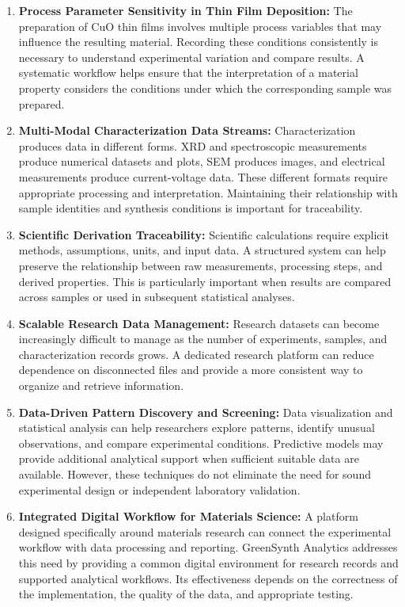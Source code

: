 \documentclass[12pt,a4paper,oneside]{report}
\begin{document}
{{{\begin{enumerate}
    \item \textbf{Process Parameter Sensitivity in Thin Film Deposition:} The preparation of $\text{CuO}$ thin films involves multiple process variables that may influence the resulting material. Recording these conditions consistently is necessary to understand experimental variation and compare results. A systematic workflow helps ensure that the interpretation of a material property considers the conditions under which the corresponding sample was prepared.
    \item \textbf{Multi-Modal Characterization Data Streams:} Characterization produces data in different forms. XRD and spectroscopic measurements produce numerical datasets and plots, SEM produces images, and electrical measurements produce current-voltage data. These different formats require appropriate processing and interpretation. Maintaining their relationship with sample identities and synthesis conditions is important for traceability.
    \item \textbf{Scientific Derivation Traceability:} Scientific calculations require explicit methods, assumptions, units, and input data. A structured system can help preserve the relationship between raw measurements, processing steps, and derived properties. This is particularly important when results are compared across samples or used in subsequent statistical analyses.
    \item \textbf{Scalable Research Data Management:} Research datasets can become increasingly difficult to manage as the number of experiments, samples, and characterization records grows. A dedicated research platform can reduce dependence on disconnected files and provide a more consistent way to organize and retrieve information.
    \item \textbf{Data-Driven Pattern Discovery and Screening:} Data visualization and statistical analysis can help researchers explore patterns, identify unusual observations, and compare experimental conditions. Predictive models may provide additional analytical support when sufficient suitable data are available. However, these techniques do not eliminate the need for sound experimental design or independent laboratory validation.
    \item \textbf{Integrated Digital Workflow for Materials Science:} A platform designed specifically around materials research can connect the experimental workflow with data processing and reporting. GreenSynth Analytics addresses this need by providing a common digital environment for research records and supported analytical workflows. Its effectiveness depends on the correctness of the implementation, the quality of the data, and appropriate testing.
\end{enumerate}

}}}
\end{document}
